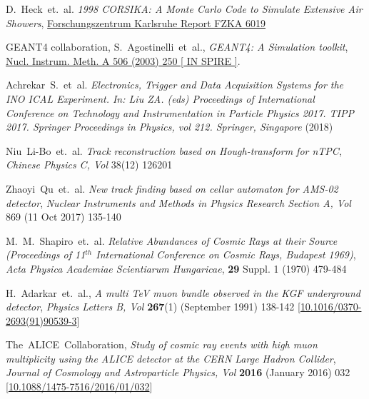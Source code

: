 \documentclass[a4paper,12pt,twoside,openany]{article}
\begin{document}
\begin{thebibliography}{9}
  D.~Heck~et.~al. \emph{1998 CORSIKA: A Monte Carlo Code to Simulate Extensive Air Showers}, \href{https://www.ikp.kit.edu/corsika/70.php}{Forschungszentrum Karlsruhe Report FZKA 6019}
    
  GEANT4 collaboration, S.~Agostinelli~et~al., \textit{GEANT4: A Simulation toolkit}, \href{https://doi.org/10.1016/j.nima.2010.08.075}{Nucl. Instrum.  Meth. A 506 (2003) 250 [ IN SPIRE ]}.
  


  Achrekar~S.~et~al. \emph{Electronics, Trigger and Data Acquisition Systems for the INO ICAL Experiment. In: Liu ZA. (eds) Proceedings of International Conference on Technology and Instrumentation in Particle Physics 2017. TIPP 2017. Springer Proceedings in Physics, vol 212. Springer, Singapore} (2018)

  Niu~Li-Bo~et.~al. \emph{Track reconstruction based on Hough-transform for nTPC}, \emph{Chinese Physics C, Vol} 38(12) 126201
  
  Zhaoyi~Qu~et.~al. \emph{New track finding based on cellar automaton for AMS-02 detector}, \emph{Nuclear Instruments and Methods in Physics Research Section A, Vol} 869 (11 Oct 2017) 135-140
  
  M.~M.~Shapiro~et.~al. \emph{Relative Abundances of Cosmic Rays at their Source (Proceedings of 11$^{th}$ International Conference on Cosmic Rays, Budapest 1969)}, \emph{Acta Physica Academiae Scientiarum Hungaricae}, \textbf{29} Suppl. 1 (1970) 479-484 

  H.~Adarkar~et.~al., \emph{A multi TeV muon bundle observed in the KGF underground detector}, \emph{Physics Letters B, Vol} \textbf{267}(1) (September 1991) 138-142 [\href{https://doi.org/10.1016/0370-2693(91)90539-3}{10.1016/0370-2693(91)90539-3}]

  The~ALICE~Collaboration, \emph{Study of cosmic ray events with high muon multiplicity using the ALICE detector at the CERN Large Hadron Collider}, \emph{Journal of Cosmology and Astroparticle Physics, Vol} \textbf{2016} (January 2016) 032 [\href{https://doi.org/10.1088/1475-7516/2016/01/032}{10.1088/1475-7516/2016/01/032}]


\end{thebibliography}
\end{document}
